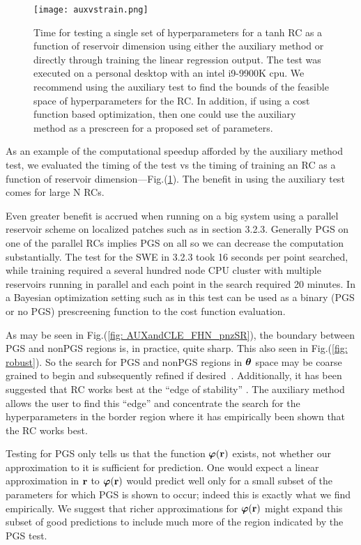 \documentclass[12pt]{article}
\begin{document}
\begin{figure}
    \centering
    \texttt{[image: auxvstrain.png]}
    \caption{Time for testing a single set of hyperparameters for a tanh RC as a function of reservoir dimension using either the auxiliary method or directly through training the linear regression output.  The test was executed on a personal desktop with an intel i9-9900K cpu.  We recommend using the auxiliary test to find the bounds of the feasible space of hyperparameters for the RC.  In addition, if using a cost function based optimization, then one could use the auxiliary method as a prescreen for a proposed set of parameters.}
    \label{fig: complexity}
\end{figure}

As an example of the computational speedup afforded by the auxiliary method test, we evaluated the timing of the test vs the timing of training an RC as a function of reservoir dimension---Fig.(\ref{fig: complexity}).  The benefit in using the auxiliary test comes for large N RCs.  

Even greater benefit is accrued when running on a big system using a parallel reservoir scheme on localized patches such as in section 3.2.3.  Generally PGS on one of the parallel RCs implies PGS on all so we can decrease the computation substantially.  The test for the SWE in 3.2.3 took 16 seconds per point searched, while training required a several hundred node CPU cluster with multiple reservoirs running in parallel and each point in the search required 20 minutes.  In a Bayesian optimization setting such as in \cite{Griffith19} this test can be used as a binary (PGS or no PGS) prescreening function to the cost function evaluation.

As may be seen in Fig.(\ref{fig: AUXandCLE_FHN_pnzSR}), the boundary between PGS and nonPGS regions is, in practice, quite sharp. This also seen in Fig.(\ref{fig: robust}). So the search for PGS and nonPGS regions in $\mbox{$\boldsymbol{\theta}$}$ space may be coarse grained to begin and subsequently refined if desired~\cite{storn97}.  Additionally, it has been suggested that RC works best at the ``edge of stability'' \cite{Carroll20}.  The auxiliary method allows the user to find this ``edge'' and concentrate the search for the hyperparameters in the border region where it has empirically been shown that the RC works best.

Testing for PGS only tells us that the function $\mbox{$\boldsymbol{\varphi}$}(\mbox{{\bf r}})$ exists, not whether our approximation to it is sufficient for prediction.  One would expect a linear approximation in $\mbox{{\bf r}}$ to $\mbox{$\boldsymbol{\varphi}$}(\mbox{{\bf r}})$ would predict well only for a small subset of the parameters for which PGS is shown to occur; indeed this is exactly what we find empirically.  We suggest that richer approximations for  $\mbox{$\boldsymbol{\varphi}$}(\mbox{{\bf r}})$  might expand this subset of good predictions to include much more of the region indicated by the PGS test.
\end{document}
